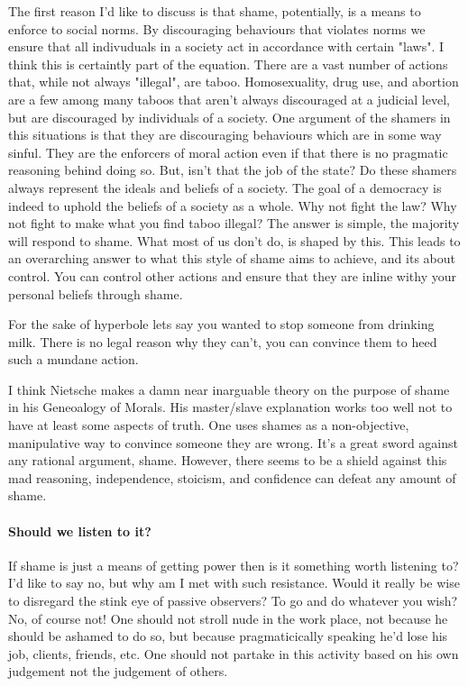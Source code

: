 \documentclass[12pt, a4paper]{article}
\begin{document}
The first reason I'd like to discuss is that shame, potentially, is a means to enforce to social norms.
By discouraging behaviours that violates norms we ensure that all indivuduals in a society act in accordance
with certain "laws". I think this is certaintly part of the equation. There are a vast number of actions that, 
while not always "illegal", are taboo. Homosexuality, drug use, and abortion are a few among many taboos that aren't 
always discouraged at a judicial level, but are discouraged by individuals of a society. One argument of the shamers
in this situations is that they are discouraging behaviours which are in some way sinful. They are the enforcers of moral action
even if that there is no pragmatic reasoning behind doing so. But, isn't that the job of the state? Do these shamers always represent the ideals and beliefs of a society.
The goal of a democracy is indeed to uphold the beliefs of a society as a whole. Why not fight the law? Why not fight to make what you find
taboo illegal? The answer is simple, the majority will respond to shame. What most of us don't do, is shaped by this. 
This leads to an overarching answer to what this style of shame aims to achieve, and its about control. You can control other actions
and ensure that they are inline withy your personal beliefs through shame. 

For the sake of hyperbole lets say you wanted to stop someone from drinking milk. There is no legal reason why they can't, you can 
convince them to heed such a mundane action. 

I think Nietsche makes a damn near inarguable theory on the purpose of shame in his Geneoalogy of Morals. His master/slave 
explanation works too well not to have at least some aspects of truth. One uses shames as a non-objective, manipulative way to 
convince someone they are wrong. It's a great sword against any rational argument, shame. 
However, there seems to be a shield against this mad reasoning, independence, stoicism, and confidence
can defeat any amount of shame. 



\paragraph{Should we listen to it? }
If shame is just a means of getting power then is it something worth listening to? I'd like to say no, but why am I met 
with such resistance. Would it really be wise to disregard the stink eye of passive observers? To go and do whatever you wish?
No, of course not! One should not stroll nude in the work place, not because he should be ashamed to do so, but because
pragmaticically speaking he'd lose his job, clients, friends, etc. One should not partake in this activity based
on his own judgement not the judgement of others. 
\end{document}
